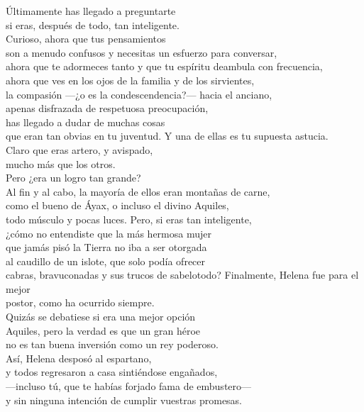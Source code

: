 \begin{versopropio}
Últimamente has llegado a preguntarte\\
si eras, después de todo, tan inteligente.\\
Curioso, ahora que tus pensamientos\\
son a menudo confusos y necesitas un esfuerzo para conversar,\\
ahora que te adormeces tanto y que tu espíritu deambula con frecuencia,\\
ahora que ves en los ojos de la familia y de los sirvientes,\\
la compasión ---¿o es la condescendencia?--- hacia el anciano,\\
apenas disfrazada de respetuosa preocupación,\\
has llegado a dudar de muchas cosas\\
que eran tan obvias en tu juventud.
\stanzabreak
Y una de ellas es tu supuesta astucia.\\
Claro que eras artero, y avispado,\\
mucho más que los otros.\\
Pero ¿era un logro tan grande?\\
Al fin y al cabo, la mayoría de ellos eran montañas de carne,\\
como el bueno de Áyax, o incluso el divino Aquiles,\\
todo músculo y pocas luces. Pero, si eras tan inteligente,\\
¿cómo no entendiste que la más hermosa mujer\\
que jamás pisó la Tierra no iba a ser otorgada\\
al caudillo de un islote, que solo podía ofrecer\\
cabras, bravuconadas y sus trucos de sabelotodo?
\stanzabreak
Finalmente, Helena fue para el mejor\\
postor, como ha ocurrido siempre.\\
Quizás se debatiese si era una mejor opción\\
Aquiles, pero la verdad es que un gran héroe\\
no es tan buena inversión como un rey poderoso.\\
Así, Helena desposó al espartano,\\
y todos regresaron a casa sintiéndose engañados,\\
---incluso tú, que te habías forjado fama de embustero---\\
y sin ninguna intención de cumplir vuestras promesas.
\end{versopropio}

